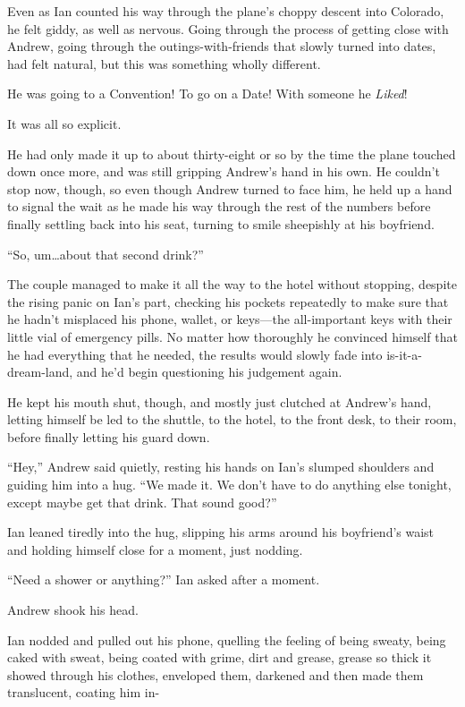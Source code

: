 Even as Ian counted his way through the plane's choppy descent into Colorado, he felt giddy, as well as nervous. Going through the process of getting close with Andrew, going through the outings-with-friends that slowly turned into dates, had felt natural, but this was something wholly different.

He was going to a Convention! To go on a Date! With someone he \emph{Liked}!

It was all so explicit.

He had only made it up to about thirty-eight or so by the time the plane touched down once more, and was still gripping Andrew's hand in his own. He couldn't stop now, though, so even though Andrew turned to face him, he held up a hand to signal the wait as he made his way through the rest of the numbers before finally settling back into his seat, turning to smile sheepishly at his boyfriend.

``So, um\ldots{}about that second drink?''

\secdiv{}

The couple managed to make it all the way to the hotel without stopping, despite the rising panic on Ian's part, checking his pockets repeatedly to make sure that he hadn't misplaced his phone, wallet, or keys---the all-important keys with their little vial of emergency pills. No matter how thoroughly he convinced himself that he had everything that he needed, the results would slowly fade into is-it-a-dream-land, and he'd begin questioning his judgement again.

He kept his mouth shut, though, and mostly just clutched at Andrew's hand, letting himself be led to the shuttle, to the hotel, to the front desk, to their room, before finally letting his guard down.

``Hey,'' Andrew said quietly, resting his hands on Ian's slumped shoulders and guiding him into a hug. ``We made it. We don't have to do anything else tonight, except maybe get that drink. That sound good?''

Ian leaned tiredly into the hug, slipping his arms around his boyfriend's waist and holding himself close for a moment, just nodding.

``Need a shower or anything?'' Ian asked after a moment.

Andrew shook his head.

Ian nodded and pulled out his phone, quelling the feeling of being sweaty, being caked with sweat, being coated with grime, dirt and grease, grease so thick it showed through his clothes, enveloped them, darkened and then made them translucent, coating him in-

